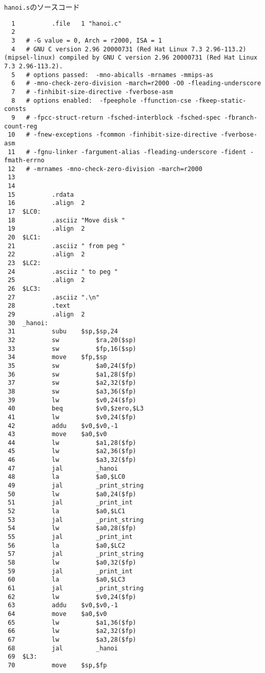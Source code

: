 \documentclass[a4j,11pt]{jarticle}
\begin{document}
\begin{description}
\verb|hanoi.s|のソースコード
\begin{verbatim}
  1          .file   1 "hanoi.c"
  2
  3   # -G value = 0, Arch = r2000, ISA = 1
  4   # GNU C version 2.96 20000731 (Red Hat Linux 7.3 2.96-113.2) 
(mipsel-linux) compiled by GNU C version 2.96 20000731 (Red Hat Linux 7.3 2.96-113.2).
  5   # options passed:  -mno-abicalls -mrnames -mmips-as
  6   # -mno-check-zero-division -march=r2000 -O0 -fleading-underscore        
  7   # -finhibit-size-directive -fverbose-asm
  8   # options enabled:  -fpeephole -ffunction-cse -fkeep-static-consts      
  9   # -fpcc-struct-return -fsched-interblock -fsched-spec -fbranch-count-reg
 10   # -fnew-exceptions -fcommon -finhibit-size-directive -fverbose-asm      
 11   # -fgnu-linker -fargument-alias -fleading-underscore -fident -fmath-errno
 12   # -mrnames -mno-check-zero-division -march=r2000
 13
 14
 15          .rdata
 16          .align  2
 17  $LC0:
 18          .asciiz "Move disk "
 19          .align  2
 20  $LC1:
 21          .asciiz " from peg "
 22          .align  2
 23  $LC2:
 24          .asciiz " to peg "
 25          .align  2
 26  $LC3:
 27          .asciiz ".\n"
 28          .text
 29          .align  2
 30  _hanoi:
 31          subu    $sp,$sp,24
 32          sw          $ra,20($sp)
 33          sw          $fp,16($sp)
 34          move    $fp,$sp
 35          sw          $a0,24($fp)
 36          sw          $a1,28($fp)
 37          sw          $a2,32($fp)
 38          sw          $a3,36($fp)
 39          lw          $v0,24($fp)
 40          beq         $v0,$zero,$L3
 41          lw          $v0,24($fp)
 42          addu    $v0,$v0,-1
 43          move    $a0,$v0
 44          lw          $a1,28($fp)
 45          lw          $a2,36($fp)
 46          lw          $a3,32($fp)
 47          jal         _hanoi
 48          la          $a0,$LC0
 49          jal         _print_string
 50          lw          $a0,24($fp)
 51          jal         _print_int
 52          la          $a0,$LC1
 53          jal         _print_string
 54          lw          $a0,28($fp)
 55          jal         _print_int
 56          la          $a0,$LC2
 57          jal         _print_string
 58          lw          $a0,32($fp)
 59          jal         _print_int
 60          la          $a0,$LC3
 61          jal         _print_string
 62          lw          $v0,24($fp)
 63          addu    $v0,$v0,-1
 64          move    $a0,$v0
 65          lw          $a1,36($fp)
 66          lw          $a2,32($fp)
 67          lw          $a3,28($fp)
 68          jal         _hanoi
 69  $L3:
 70          move    $sp,$fp

\end{verbatim}
\end{description}
\end{document}
